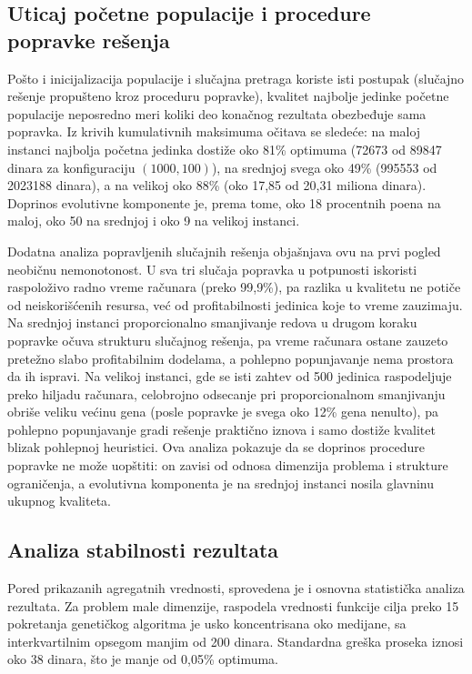 \documentclass[12pt]{article}
\begin{document}
\subsection{Uticaj početne populacije i procedure popravke rešenja}\label{sec:pocetni-kvalitet}

Pošto i inicijalizacija populacije i slučajna pretraga koriste isti postupak (slučajno rešenje propušteno kroz proceduru popravke), kvalitet najbolje jedinke početne populacije neposredno meri koliki deo konačnog rezultata obezbeđuje sama popravka. Iz krivih kumulativnih maksimuma očitava se sledeće: na maloj instanci najbolja početna jedinka dostiže oko 81\% optimuma (72673 od 89847 dinara za konfiguraciju $(1000, 100)$), na srednjoj svega oko 49\% (995553 od 2023188 dinara), a na velikoj oko 88\% (oko 17,85 od 20,31 miliona dinara). Doprinos evolutivne komponente je, prema tome, oko 18 procentnih poena na maloj, oko 50 na srednjoj i oko 9 na velikoj instanci.

Dodatna analiza popravljenih slučajnih rešenja objašnjava ovu na prvi pogled neobičnu nemonotonost. U sva tri slučaja popravka u potpunosti iskoristi raspoloživo radno vreme računara (preko 99{,}9\%), pa razlika u kvalitetu ne potiče od neiskorišćenih resursa, već od profitabilnosti jedinica koje to vreme zauzimaju. Na srednjoj instanci proporcionalno smanjivanje redova u drugom koraku popravke očuva strukturu slučajnog rešenja, pa vreme računara ostane zauzeto pretežno slabo profitabilnim dodelama, a pohlepno popunjavanje nema prostora da ih ispravi. Na velikoj instanci, gde se isti zahtev od 500 jedinica raspodeljuje preko hiljadu računara, celobrojno odsecanje pri proporcionalnom smanjivanju obriše veliku većinu gena (posle popravke je svega oko 12\% gena nenulto), pa pohlepno popunjavanje gradi rešenje praktično iznova i samo dostiže kvalitet blizak pohlepnoj heuristici. Ova analiza pokazuje da se doprinos procedure popravke ne može uopštiti: on zavisi od odnosa dimenzija problema i strukture ograničenja, a evolutivna komponenta je na srednjoj instanci nosila glavninu ukupnog kvaliteta.

\subsection{Analiza stabilnosti rezultata}

Pored prikazanih agregatnih vrednosti, sprovedena je i osnovna statistička analiza rezultata. Za problem male dimenzije, raspodela vrednosti funkcije cilja preko 15 pokretanja genetičkog algoritma je usko koncentrisana oko medijane, sa interkvartilnim opsegom manjim od 200 dinara. Standardna greška proseka iznosi oko 38 dinara, što je manje od 0,05\% optimuma.
\end{document}
